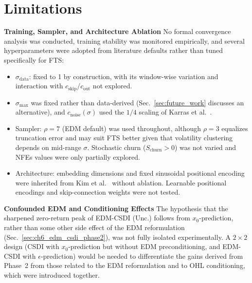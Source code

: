 \section{Limitations}
\label{sec:limitations}

\textbf{Training, Sampler, and Architecture Ablation} \quad No formal convergence analysis was conducted, training stability was monitored 
empirically, and several hyperparameters were adopted from literature defaults rather than tuned specifically for FTS:
\begin{itemize}
    \item \(\sigma_{\text{data}}\): fixed to 1 by construction, with its window-wise variation and interaction with \(c_{\text{skip}}\)/\(c_{\text{out}}\) not explored.
    \item \(\sigma_{\max}\) was fixed rather than data-derived (Sec.\ \ref{sec:future_work} discusses an alternative), and \(c_{\text{noise}}(\sigma)\) used the \(1/4\) scaling of Karras et al.\ \cite{karras2022elucidating}.
    \item Sampler: \(\rho=7\) (EDM default) was used throughout, although \(\rho=3\) equalizes truncation error and may suit FTS better given that volatility clustering depends on mid-range \(\sigma\). Stochastic churn (\(S_{\text{churn}}>0\)) was not varied and NFEs values were only partially explored.
    \item Architecture: embedding dimensions and fixed sinusoidal positional encoding were inherited from Kim et al.\ \cite{kim2025diffusion} without ablation. Learnable positional encodings and skip-connection weights were not tested.
\end{itemize}

\textbf{Confounded EDM and Conditioning Effects} \quad The hypothesis that the sharpened zero-return peak of EDM-CSDI (Unc.) follows from \(x_0\)-prediction, rather than some other side effect of the EDM reformulation (Sec.\ \ref{sec:ch6_edm_csdi_phase2}), was not fully isolated experimentally. A \(2\times2\) design (CSDI with \(x_0\)-prediction but without EDM preconditioning, and EDM-CSDI with \(\epsilon\)-prediction) would be needed to differentiate the gains derived from Phase~2 from those related to the EDM reformulation and to OHL conditioning, which were introduced together.

